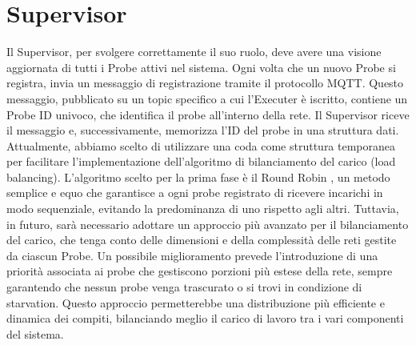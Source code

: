 \documentclass[target=bach,aauheader=,style=]{thud}
\begin{document}
\section{Supervisor}
Il Supervisor, per svolgere correttamente il suo ruolo, deve avere una visione aggiornata di tutti i Probe attivi nel sistema. Ogni volta che un nuovo Probe si registra, invia un messaggio di registrazione tramite il protocollo MQTT. Questo messaggio, pubblicato su un topic specifico a cui l'Executer è iscritto, contiene un Probe ID univoco, che identifica il probe all'interno della rete.
\newline
Il Supervisor riceve il messaggio e, successivamente, memorizza l'ID del probe in una struttura dati. Attualmente, abbiamo scelto di utilizzare una coda come struttura temporanea per facilitare l'implementazione dell'algoritmo di bilanciamento del carico (load balancing). L'algoritmo scelto per la prima fase è il Round Robin , un metodo semplice e equo che garantisce a ogni probe registrato di ricevere incarichi in modo sequenziale, evitando la predominanza di uno rispetto agli altri.
\newline
Tuttavia, in futuro, sarà necessario adottare un approccio più avanzato per il bilanciamento del carico, che tenga conto delle dimensioni e della complessità delle reti gestite da ciascun Probe. Un possibile miglioramento prevede l'introduzione di una priorità associata ai probe che gestiscono porzioni più estese della rete, sempre garantendo che nessun probe venga trascurato o si trovi in condizione di starvation. Questo approccio permetterebbe una distribuzione più efficiente e dinamica dei compiti, bilanciando meglio il carico di lavoro tra i vari componenti del sistema.
\end{document}
